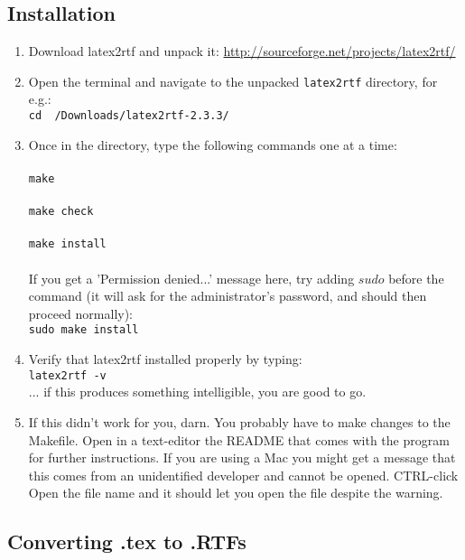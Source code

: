 \documentclass{article}
\begin{document}
\subsection{Installation}
\begin{enumerate}
\item Download latex2rtf and unpack it:
  \url{http://sourceforge.net/projects/latex2rtf/}
\item Open the terminal and navigate to the unpacked \texttt{latex2rtf}
  directory, for e.g.: \\
\texttt{cd ~/Downloads/latex2rtf-2.3.3/}
\item Once in the directory, type the following commands one at a
  time:\\
\\
\texttt{make}\\
\\
\texttt{make check}\\
\\
\texttt{make install}\\
\\
If you get a 'Permission denied...' message here, try adding $sudo$ before the
command (it will ask for the administrator's password, and should then
proceed normally):\\
\texttt{sudo make install}
\item Verify that latex2rtf installed properly by typing: \\
\texttt{latex2rtf -v}\\
... if this produces something intelligible, you are good to go.
\item If this didn't work for you, darn. You probably have to make
  changes to the Makefile. Open in a text-editor the README that comes
  with the program for further instructions. If you are using a Mac
  you might get a message that this comes from an unidentified
  developer and cannot be opened. CTRL-click Open the file
  name and it should let you open the file despite the warning.
\end{enumerate}

\subsection{Converting .tex to .RTFs}
\end{document}
